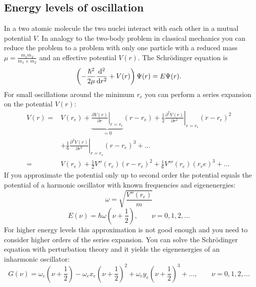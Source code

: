 \subsection{Energy levels of oscillation}
In a two atomic molecule the two nuclei interact with each other in a mutual potential $V$. In analogy to the two-body problem in classical 
mechanics you can reduce the problem to a problem with only one particle with a reduced mass $\mu = \frac{m_1 m_2}{m_1 + m_2}$ and an effective 
potential $V(r)$. The Schrödinger equation is 
\begin{equation}
  \left( - \frac{\hbar^2}{2 \mu} \frac{\mathrm{d}^2}{\mathrm{d} r^2} + V(r) \right) \Psi(r) = E \Psi(r) .
\end{equation}
For small oscillations around the minimum $r_e$ you can perform a series expansion on the potential $V(r)$:
\begin{equation}
\begin{split}
  V(r) = &  V(r_e) + \underbrace{\left. \frac{\partial V(r)}{\partial r} \right|_{r=r_e}}_{=0} (r-r_e)
     + \left. \frac{1}{2} \frac{\partial^2 V(r)}{\partial r^2} \right|_{r=r_e}(r-r_e)^2 \\
  & + \left. \frac{1}{6} \frac{\partial^3 V(r)}{\partial r^3} \right|_{r=r_e}(r-r_e)^3 + \ldots \\
  = & V(r_e) + \frac{1}{2} V''(r_e)(r-r_e)^2 + \frac{1}{6} V'''(r_e)(r_re)^3 + \ldots
\end{split}
\end{equation}
If you approximate the potential only up to second order the potential equals the potential of a harmonic oscillator with known frequencies and 
eigenenergies:
\begin{equation}
  \omega = \sqrt{\frac{V''(r_e)}{m}}
\end{equation}
\begin{equation}
  E(\nu) =  \hbar \omega \left( \nu + \frac{1}{2} \right), \qquad \nu = 0, 1, 2, \ldots
\end{equation}
For higher energy levels this approximation is not good enough and you need to consider higher orders of the series expansion. You can solve the
Schrödinger equation with perturbation theory and it yields the eigenenergies of an inharmonic oscillator:
\begin{equation}
  G(\nu) = \omega_e \left( \nu + \frac{1}{2} \right) - \omega_e x_e \left( \nu + \frac{1}{2} \right)^2 
            + \omega_e y_e \left( \nu + \frac{1}{2} \right)^3 + \ldots, \qquad \nu = 0, 1, 2, \ldots
\end{equation}
